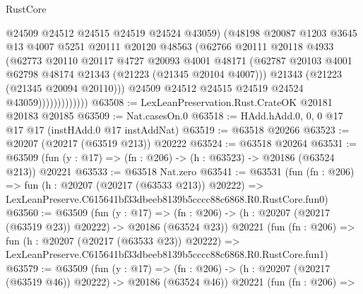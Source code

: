 \begin{lexlean}{RustCore}
\begin{coremodule}
                            @24509
                            @24512
                            @24515
                            @24519
                            @24524
                            @43059)
                          (@48198
                            @20087
                            @1203
                            @3645
                            @13
                            @4007
                            @5251
                            @20111
                            @20120
                            @48563
                            (@62766
                              @20111
                              @20118
                              @4933
                              (@62773
                                @20110
                                @20117
                                @4727
                                @20093
                                @4001
                                @48171
                                (@62787
                                  @20103
                                  @4001
                                  @62798
                                  @48174
                                  @21343
                                  (@21223 (@21345 @20104 @4007)))
                                @21343
                                (@21223 (@21345 @20094 @20110)))
                              @24509
                              @24512
                              @24515
                              @24519
                              @24524
                              @43059)))))))))))))
@63508 := LexLeanPreservation.Rust.CrateOK @20181 @20183 @20185
@63509 := Nat.casesOn.{0}
@63518 := HAdd.hAdd.{0, 0, 0} @17 @17 @17 (instHAdd.{0} @17 instAddNat)
@63519 := @63518 @20266
@63523 := @20207 (@20217 (@63519 @213)) @20222
@63524 := @63518 @20264
@63531 := @63509 (fun (y : @17) => (fn : @206) -> (h : @63523) -> @20186 (@63524 @213)) @20221
@63533 := @63518 Nat.zero
@63541 := @63531
    (fun (fn : @206) =>
    fun (h : @20207 (@20217 (@63533 @213)) @20222) =>
    LexLeanPreserve.C615641bf33dbeeb8139b5cccc88c6868.R0.RustCore.fun0)
@63560 := @63509
    (fun (y : @17) =>
    (fn : @206) -> (h : @20207 (@20217 (@63519 @23)) @20222) -> @20186 (@63524 @23))
    @20221
    (fun (fn : @206) =>
    fun (h : @20207 (@20217 (@63533 @23)) @20222) =>
    LexLeanPreserve.C615641bf33dbeeb8139b5cccc88c6868.R0.RustCore.fun1)
@63579 := @63509
    (fun (y : @17) =>
    (fn : @206) -> (h : @20207 (@20217 (@63519 @46)) @20222) -> @20186 (@63524 @46))
    @20221
    (fun (fn : @206) =>

\end{coremodule}
\end{lexlean}
